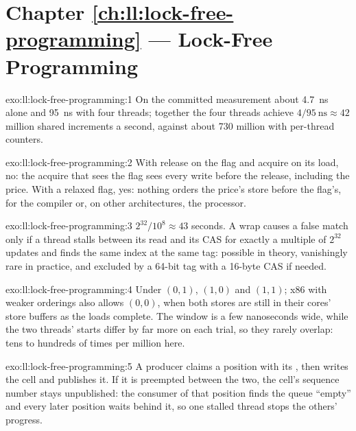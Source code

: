 \section*{Chapter \ref{ch:ll:lock-free-programming} --- Lock-Free Programming}

\begin{solution}{exo:ll:lock-free-programming:1}
On the committed measurement about \qty{4.7}{\nano\second} alone and \qty{95}{\nano\second} with four threads; together the four
threads achieve $4/\qty{95}{\nano\second} \approx 42$ million shared increments a second, against about 730 million with
per-thread counters.
\end{solution}

\begin{solution}{exo:ll:lock-free-programming:2}
With release on the flag and acquire on its load, no: the acquire that sees the flag sees every write before the release,
including the price. With a relaxed flag, yes: nothing orders the price's store before the flag's, for the compiler or,
on other architectures, the processor.
\end{solution}

\begin{solution}{exo:ll:lock-free-programming:3}
$2^{32}/10^8 \approx 43$ seconds. A wrap causes a false match only if a thread stalls between its read and its CAS for exactly
a multiple of $2^{32}$ updates and finds the same index at the same tag: possible in theory, vanishingly rare in practice,
and excluded by a 64-bit tag with a 16-byte CAS if needed.
\end{solution}

\begin{solution}{exo:ll:lock-free-programming:4}
Under  $(0,1)$, $(1,0)$ and $(1,1)$; x86 with weaker orderings also allows $(0,0)$, when both stores are
still in their cores' store buffers as the loads complete. The window is a few nanoseconds wide, while the two threads' starts
differ by far more on each trial, so they rarely overlap: tens to hundreds of times per million here.
\end{solution}

\begin{solution}{exo:ll:lock-free-programming:5}
A producer claims a position with its , then writes the cell and publishes it. If it is preempted between the
two, the cell's sequence number stays unpublished: the consumer of that position finds the queue ``empty'' and every later
position waits behind it, so one stalled thread stops the others' progress.
\end{solution}

